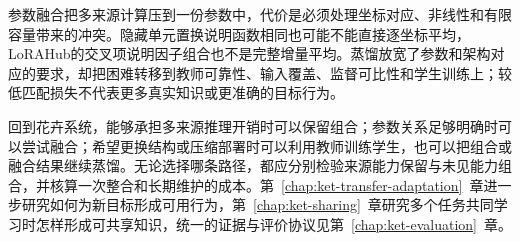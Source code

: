 参数融合把多来源计算压到一份参数中，代价是必须处理坐标对应、非线性和有限容量带来的冲突。隐藏单元置换说明函数相同也可能不能直接逐坐标平均，LoRAHub的交叉项说明因子组合也不是完整增量平均。蒸馏放宽了参数和架构对应的要求，却把困难转移到教师可靠性、输入覆盖、监督可比性和学生训练上；较低匹配损失不代表更多真实知识或更准确的目标行为。

回到花卉系统，能够承担多来源推理开销时可以保留组合；参数关系足够明确时可以尝试融合；希望更换结构或压缩部署时可以利用教师训练学生，也可以把组合或融合结果继续蒸馏。无论选择哪条路径，都应分别检验来源能力保留与未见能力组合，并核算一次整合和长期维护的成本。第~\ref{chap:ket-transfer-adaptation}~章进一步研究如何为新目标形成可用行为，第~\ref{chap:ket-sharing}~章研究多个任务共同学习时怎样形成可共享知识，统一的证据与评价协议见第~\ref{chap:ket-evaluation}~章。
